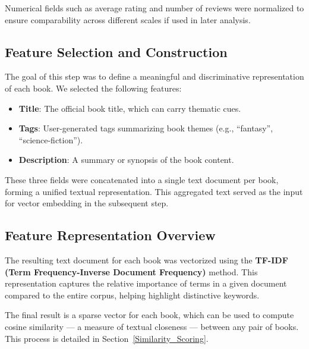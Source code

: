Numerical fields such as average rating and number of reviews were normalized to ensure comparability across different scales if used in later analysis.

\subsection{Feature Selection and Construction}

The goal of this step was to define a meaningful and discriminative representation of each book. We selected the following features:

\begin{itemize}
	\item \textbf{Title}: The official book title, which can carry thematic cues.
	\item \textbf{Tags}: User-generated tags summarizing book themes (e.g., ``fantasy'', ``science-fiction'').
	\item \textbf{Description}: A summary or synopsis of the book content.
\end{itemize}

These three fields were concatenated into a single text document per book, forming a unified textual representation. This aggregated text served as the input for vector embedding in the subsequent step.

\subsection{Feature Representation Overview}

The resulting text document for each book was vectorized using the \textbf{TF-IDF (Term Frequency-Inverse Document Frequency)} method. This representation captures the relative importance of terms in a given document compared to the entire corpus, helping highlight distinctive keywords.

The final result is a sparse vector for each book, which can be used to compute cosine similarity — a measure of textual closeness — between any pair of books. This process is detailed in Section~\ref{Similarity_Scoring}.

